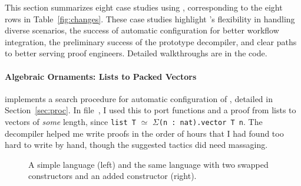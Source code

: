 This section summarizes eight case studies using \toolnamec,
corresponding to the eight rows in Table~\ref{fig:changes}.
These case studies highlight \toolnamec's flexibility in handling diverse scenarios,
the success of automatic configuration for better workflow integration, %
the preliminary success of the prototype decompiler,
and clear paths to better serving proof engineers.
Detailed walkthroughs are in the code.

\paragraph{Algebraic Ornaments: Lists to Packed Vectors}
\iffalse
The transformation in \toolnamec is a generalization of the transformation from \textsc{Devoid}.
\textsc{Devoid} supported proof reuse across \textit{algebraic ornaments}, which describe relations
between two inductive types, where one type is the other indexed by a fold~\cite{mcbride}.
A standard example is the relation between a list and a
length-indexed vector (Figure~\ref{fig:listtovect}).
\fi
\toolnamec implements a search procedure for automatic configuration of ,
detailed in Section~\ref{sec:proc}.
In file~\href{https://github.com/uwplse/pumpkin-pi/blob/v2.0.0/plugin/coq/examples/Example.v}{}, I used this to port
functions and a proof from lists to vectors of \textit{some} length, since \lstinline{list T} $\simeq$ $\Sigma$\lstinline{(n : nat).vector T n}.
The decompiler helped me write proofs in the order of hours that I had found too hard to write by hand,
though the suggested tactics did need massaging.

\begin{figure*}
\begin{minipage}{0.48\textwidth}
   
\end{minipage}
\hfill
\begin{minipage}{0.48\textwidth}
   
\end{minipage}
\vspace{-0.3cm}
\caption{A simple language (left) and the same language with two swapped constructors and an added constructor (right).}
\vspace{0.1cm}
\label{fig:replica}
\end{figure*}


